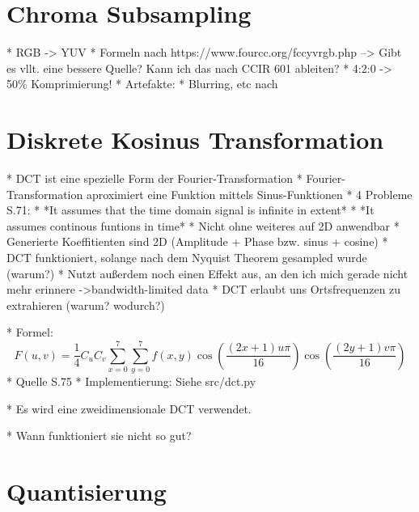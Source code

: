 \section{Chroma Subsampling}

* RGB -> YUV
* Formeln nach https://www.fourcc.org/fccyvrgb.php --> Gibt es vllt. eine bessere Quelle? Kann ich das nach CCIR 601 ableiten?
* 4:2:0 -> 50\% Komprimierung!
* Artefakte: * Blurring, etc nach \cite{akramullah_digital_2014}

\section{Diskrete Kosinus Transformation}

* DCT ist eine spezielle Form der Fourier-Transformation
	* Fourier-Transformation aproximiert eine Funktion mittels Sinus-Funktionen
	* 4 Probleme \cite{symes_peter_digital_2004} S.71:
		* *It assumes that the time domain signal is infinite in extent*
		* *It assumes continous funtions in time*
		* Nicht ohne weiteres auf 2D anwendbar
		* Generierte Koeffitienten sind 2D (Amplitude + Phase bzw. sinus + cosine)
	* DCT funktioniert, solange nach dem Nyquist Theorem gesampled wurde (warum?)
	* Nutzt außerdem noch einen Effekt aus, an den ich mich gerade nicht mehr erinnere ->bandwidth-limited data
* DCT erlaubt uns Ortsfrequenzen zu extrahieren (warum? wodurch?)

* Formel: \[F(u,v) = \frac{1}{4} C_uC_v\sum_{x=0}^7 \sum_{y=0}^7 f(x,y) \cos \left(\frac{(2x+1)u\pi}{16}\right) \cos\left(\frac{(2y+1)v\pi}{16}\right) \]
	* Quelle \cite{symes_peter_digital_2004} S.75
* Implementierung: Siehe src/dct.py

* Es wird eine zweidimensionale DCT verwendet.

* Wann funktioniert sie nicht so gut?

\section{Quantisierung}
